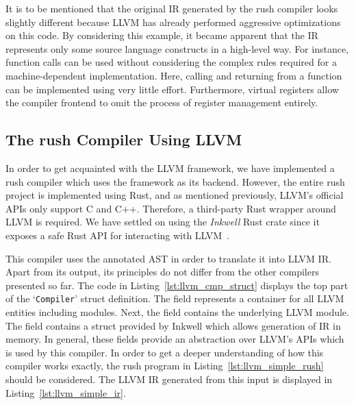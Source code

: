 It is to be mentioned that the original IR generated by the rush compiler looks slightly different because LLVM has already performed aggressive optimizations on this code.
By considering this example, it became apparent that the IR represents only some source language constructs in a high-level way.
For instance, function calls can be used without considering the complex rules required for a machine-dependent implementation.
Here, calling and returning from a function can be implemented using very little effort.
Furthermore, virtual registers allow the compiler frontend to omit the process of register management entirely.

\subsection{The rush Compiler Using LLVM}


In order to get acquainted with the LLVM framework, we have implemented a rush compiler which uses the framework as its backend.
However, the entire rush project is implemented using Rust, and as mentioned previously, LLVM's official APIs only support C and C++.
Therefore, a third-party Rust wrapper around LLVM is required.
We have settled on using the \emph{Inkwell} Rust crate since it exposes a safe Rust API for interacting with LLVM~\cite{Inkwell2023}.

This compiler uses the annotated AST in order to translate it into LLVM IR\@.
Apart from its output, its principles do not differ from the other compilers presented so far.
The code in Listing~\ref{lst:llvm_cmp_struct} displays the top part of the `\texttt{Compiler}' struct definition.
The  field represents a container for all LLVM entities including modules.
Next, the  field contains the underlying LLVM module.
The  field contains a struct provided by Inkwell which allows generation of IR in memory.
In general, these fields provide an abstraction over LLVM's APIs which is used by this compiler.
In order to get a deeper understanding of how this compiler works exactly, the rush program in Listing~\ref{lst:llvm_simple_rush} should be considered.
The LLVM IR generated from this input is displayed in Listing~\ref{lst:llvm_simple_ir}.

